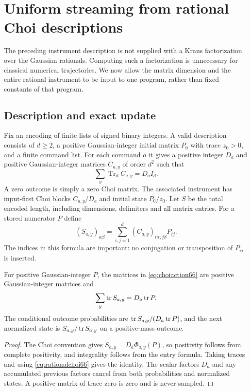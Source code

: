 \section{Uniform streaming from rational Choi descriptions}\label{sec:uniformchoi66}
The preceding instrument description is not supplied with a Kraus
factorization over the Gaussian rationals. Computing such a
factorization is unnecessary for classical numerical trajectories. We now allow the
matrix dimension and the entire rational instrument to be input to one
program, rather than fixed constants of that program.

\subsection{Description and exact update}
Fix an encoding of finite lists of signed binary integers. A valid
description consists of $d\ge2$, a positive Gaussian-integer initial
matrix $P_0$ with trace $z_0>0$, and a finite command list. For each
command $a$ it gives a positive integer $D_a$ and positive
Gaussian-integer matrices $C_{a,y}$ of order $d^2$ such that
\begin{equation}\label{eq:rationalchoi66}
           \sum_y\operatorname{Tr}_d C_{a,y}=D_a I_d.
\end{equation}
A zero outcome is simply a zero Choi matrix. The associated instrument
has input-first Choi blocks $C_{a,y}/D_a$ and initial state $P_0/z_0$.
Let $S$ be the total encoded length, including dimensions, delimiters
and all matrix entries. For a stored numerator $P$ define
\begin{equation}\label{eq:choiaction66}
 (S_{a,y})_{\alpha\beta}
       =\sum_{i,j=1}^d(C_{a,y})_{i\alpha,j\beta}P_{ij}.
\end{equation}
The indices in this formula are important: no conjugation or
transposition of $P_{ij}$ is inserted.

\begin{lemma}\label{lem:choitrajectory66}
For positive Gaussian-integer $P$, the matrices in
\eqref{eq:choiaction66} are positive Gaussian-integer matrices and
\[
                 \sum_y\operatorname{tr} S_{a,y}=D_a\operatorname{tr} P.
\]
The conditional outcome probabilities are
$\operatorname{tr} S_{a,y}/(D_a\operatorname{tr} P)$, and the next normalized state is
$S_{a,y}/\operatorname{tr} S_{a,y}$ on a positive-mass outcome.
\end{lemma}
\begin{proof}
The Choi convention gives $S_{a,y}=D_a\Phi_{a,y}(P)$, so positivity
follows from complete positivity, and integrality follows from the
entry formula. Taking traces and using \eqref{eq:rationalchoi66}
gives the identity. The scalar factors $D_a$ and any accumulated
previous factors cancel from both probabilities and normalized states.
A positive matrix of trace zero is zero and is never sampled.
\end{proof}

